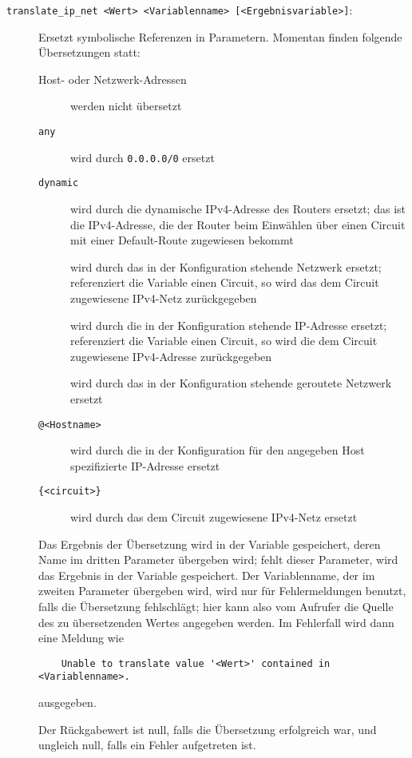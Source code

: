 \begin{description}

\item[\texttt{translate\_ip\_net <Wert> <Variablenname> [<Ergebnisvariable>]}:]
Ersetzt symbolische Referenzen in
Parametern. Momentan finden folgende Übersetzungen statt:
\begin{description}
\item[Host- oder Netzwerk-Adressen] werden nicht übersetzt
\item[\texttt{any}] wird durch \texttt{0.0.0.0/0} ersetzt
\item[\texttt{dynamic}] wird durch die dynamische IPv4-Adresse des Routers
ersetzt; das ist die IPv4-Adresse, die der Router beim Einwählen über einen
Circuit mit einer Default-Route zugewiesen bekommt
\item[] wird durch das in der Konfiguration stehende
Netzwerk ersetzt; referenziert die Variable einen Circuit, so wird das dem
Circuit zugewiesene IPv4-Netz zurückgegeben
\item[] wird durch die in der Konfiguration stehende
IP-Adresse ersetzt; referenziert die Variable einen Circuit, so wird die dem
Circuit zugewiesene IPv4-Adresse zurückgegeben
\item[] wird durch das in der Konfiguration stehende
geroutete Netzwerk ersetzt
\item[\texttt{@<Hostname>}] wird durch die in der Konfiguration für den
angegeben Host spezifizierte IP-Adresse ersetzt
\item[\texttt{\{<circuit>\}}] wird durch das dem Circuit zugewiesene IPv4-Netz
ersetzt
\end{description}

Das Ergebnis der Übersetzung wird in der Variable gespeichert, deren Name im
dritten Parameter übergeben wird; fehlt dieser Parameter, wird das Ergebnis in
der Variable  gespeichert. Der Variablenname, der im zweiten Parameter
übergeben wird, wird nur für Fehlermeldungen benutzt, falls die Übersetzung
fehlschlägt; hier kann also vom Aufrufer die Quelle des zu übersetzenden Wertes
angegeben werden. Im Fehlerfall wird dann eine Meldung wie

\begin{example}
\begin{verbatim}
    Unable to translate value '<Wert>' contained in <Variablenname>.
\end{verbatim}
\end{example}

ausgegeben.

Der Rückgabewert ist null, falls die Übersetzung erfolgreich war, und ungleich
null, falls ein Fehler aufgetreten ist.

\end{description}

